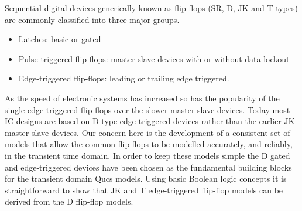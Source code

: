 Sequential digital devices generically known as flip-flops (SR, D, JK
and T types) are commonly classified into three major groups.
\begin{itemize}
\item
Latches: basic or gated 
\item
Pulse triggered flip-flops: master slave devices with or without data-lockout
\item
Edge-triggered flip-flops: leading or trailing edge triggered.
\end{itemize}

As the speed of electronic systems has increased so has the popularity
of the single edge-triggered flip-flops over the slower master slave
devices.  Today most IC designs are based on D type edge-triggered
devices rather than the earlier JK master slave devices. Our concern
here is the development of a consistent set of models that allow the
common flip-flops to be modelled accurately, and reliably, in the
transient time domain. In order to keep these models simple the D
gated and edge-triggered devices have been chosen as the fundamental
building blocks for the transient domain Qucs models. Using basic
Boolean logic concepts it is straightforward to show that JK and T
edge-triggered flip-flop models can be derived from the D flip-flop
models.


